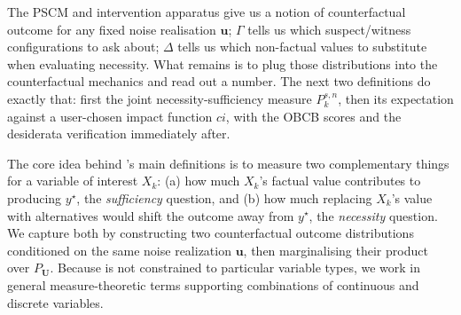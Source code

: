


The PSCM and intervention apparatus give us a notion of
counterfactual outcome for any fixed noise realisation $\mathbf{u}$; $\Gamma$ tells
us which suspect/witness configurations to ask about; $\Delta$ tells us which
non-factual values to substitute when evaluating necessity. What remains is to plug
those distributions into the counterfactual mechanics and read out a number. The
next two definitions do exactly that: first the joint necessity-sufficiency
measure $P_k^{s,n}$, then its expectation against a user-chosen impact function
$ci$, with the OBCB scores and the desiderata verification immediately after.

The core idea behind \Ourapproach's main definitions is to
measure two complementary things for a variable of interest $X_k$: (a) how much $X_k$'s
factual value contributes to producing $y^\star$, the \emph{sufficiency} question,
and (b) how much replacing $X_k$'s value with alternatives would shift the outcome away
from $y^\star$, the \emph{necessity} question. We capture both by constructing two
counterfactual outcome distributions conditioned on the same noise realization $\mathbf{u}$,
then marginalising their product over $P_{\mathbf{U}}$. Because \ourapproach is not
constrained to particular variable types, we work in general measure-theoretic terms
supporting combinations of continuous and discrete variables.

